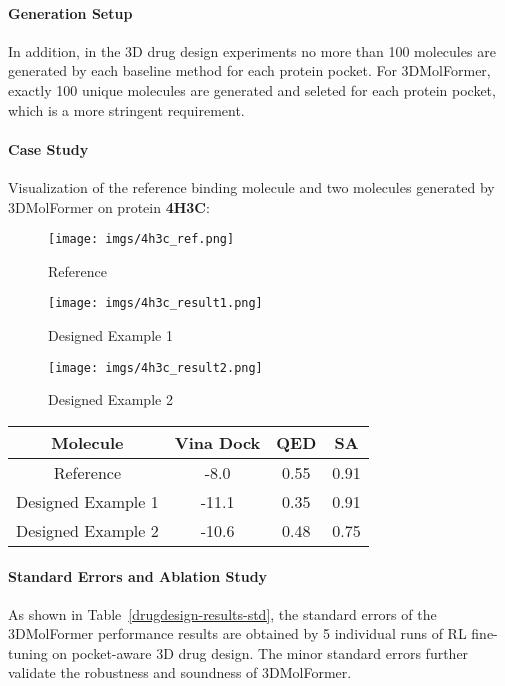 \paragraph{Generation Setup}
In addition, in the 3D drug design experiments no more than 100 molecules are generated by each baseline method for each protein pocket. For 3DMolFormer, exactly 100 unique molecules are generated and seleted for each protein pocket, which is a more stringent requirement.

\paragraph{Case Study}
Visualization of the reference binding molecule and two molecules generated by 3DMolFormer on protein \textbf{4H3C}:
\begin{figure}[ht]
\centering
\begin{minipage}{0.325\textwidth}
    \centering
    \texttt{[image: imgs/4h3c\_ref.png]}
    \centerline{Reference}
\end{minipage}
\begin{minipage}{0.325\textwidth}
    \centering
    \texttt{[image: imgs/4h3c\_result1.png]}
    \centerline{Designed Example 1}
\end{minipage}
\begin{minipage}{0.325\textwidth}
    \centering
    \texttt{[image: imgs/4h3c\_result2.png]}
    \centerline{Designed Example 2}
\end{minipage}
\end{figure}
\begin{table}[ht]
\begin{center}
\begin{tabular}{cccc}
\hline
Molecule & Vina Dock & QED & SA \\ \hline
Reference & -8.0 & 0.55 & 0.91 \\ 
Designed Example 1 & -11.1 & 0.35 & 0.91 \\ 
Designed Example 2 & -10.6 & 0.48 & 0.75 \\ \hline
\end{tabular}
\end{center}
\end{table}



\paragraph{Standard Errors and Ablation Study}
As shown in Table~\ref{drugdesign-results-std}, the standard errors of the 3DMolFormer performance results are obtained by 5 individual runs of RL fine-tuning on pocket-aware 3D drug design. The minor standard errors further validate the robustness and soundness of 3DMolFormer.

